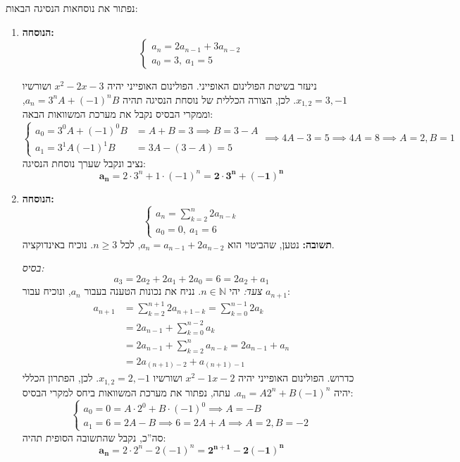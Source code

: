 \documentclass[]{article}
\newcommand\N     {\mathbb{N}}
\newcommand\xot       {x_{1, 2}}
\newcommand\ano       {a_{n - 1}}
\newcommand\ant       {a_{n - 2}}
\begin{document}
	\section{} %
	נפתור את נוסחאות הנסיגה הבאות: 
	\begin{enumerate}
		\item \textbf{הנוסחה: }
		\[ \begin{cases}
			a_n = 2\ano + 3\ant \\
			a_0 = 3, \ a_1 = 5
		\end{cases} \]
		
		ניעזר בשיטת הפולינום האופייני. הפולינום האופייני יהיה $x^2 - 2x - 3 $ ושורשיו $\xot = 3, -1 $. לכן, הצורה הכללית של נוסחת הנסיגה תהיה $a_n = 3^nA + (-1)^nB $, וממקרי הבסיס נקבל את מערכת המשוואות הבאה: 
		\[ \begin{cases}
			a_0 = 3^0A + (-1)^{0}B &= A + B = 3 \implies B = 3 - A \\
			a_1 = 3^{1}A (-1)^{1}B &= 3A - (3 - A) = 5
		\end{cases} \implies 4A - 3 = 5 \implies 4A = 8 \implies A = 2, B = 1 \]
		נציב ונקבל שערך נוסחת הנסיגה: 
		\[ \bm{a_n} = 2 \cdot 3^{n} + 1 \cdot (-1)^{n} = \bm{2 \cdot 3^{n} + (-1)^{n}} \]
		\item \textbf{הנוסחה: }
		\[ \begin{cases}
			a_n = \sum_{k = 2}^{n} 2 a_{n - k} \\
			a_0 = 0, \ a_1 = 6
		\end{cases} \]
		\textbf{תשובה: }נטען, שהביטוי הוא $a_n = a_{n - 1} + 2a_{n - 2}$, לכל $n \ge 3$. נוכיח באינדוקציה. 
		
		\textit{בסיס: }
		\[a_{3} = 2a_2 + 2a_1 + 2a_{0} = 6 = 2a_2 + a_1\]
		\textit{צעד: }
			יהי $n \in \N$. נניח את נכונות הטענה בעבור $a_n$, ונוכיח עבור $a_{n + 1}$: 
		\begin{align*}
			a_{n + 1} &= \sum_{k = 2}^{n + 1} 2a_{n + 1 - k} = \sum_{k = 0}^{n - 1}2a_{k} \\
			&= 2a_{n - 1} + \sum_{k = 0}^{n - 2}a_k \\
			&= 2a_{n - 1} + \sum_{k = 2}^{n}a_{n - k} = 2a_{n - 1} + a_{n} \\
			&= 2a_{(n + 1) - 2} + a_{(n + 1) - 1}
		\end{align*}
		כדרוש. 
		הפולינום האופייני יהיה $x^2 - 1x - 2$ ושורשיו $\xot = 2, -1$. לכן, הפתרון הכללי יהיה $a_n = A2^n + B(-1)^{n}$. עתה, נפתור את מערכת המשוואות ביחס למקרי הבסיס: 
		\[ \begin{cases}
			a_0 = 0 = A \cdot 2^{0} + B \cdot (-1)^{0} \implies A = -B \\
			a_1 = 6 = 2A - B \implies 6 = 2A + A \implies A = 2, B = -2
		\end{cases} \]
		סה''כ, נקבל שהתשובה הסופית תהיה: 
		\[ \bm{a_n} = 2 \cdot 2^{n} -2(-1)^{n} \bm{= 2^{n + 1} - 2(-1)^{n}} \]
		
	
	\end{enumerate}
\end{document}

